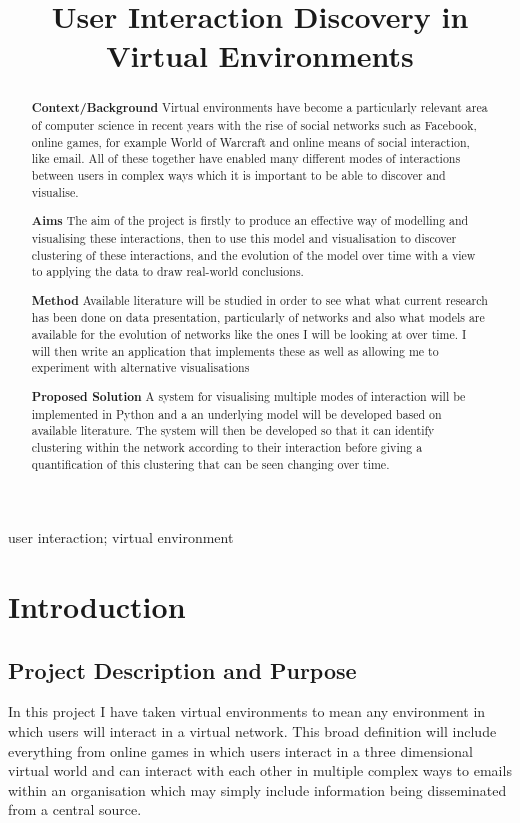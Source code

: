 \documentclass[12pt,a4paper]{article}
\title{User Interaction Discovery in Virtual Environments}
\date{}
\begin{document}
\maketitle

\begin{abstract}

{\bf Context/Background}
Virtual environments have become a particularly relevant area of computer science in recent years with the rise of social networks such as Facebook, online games, for example World of Warcraft and online means of social interaction, like email. All of these together have enabled many different modes of interactions between users in complex ways which it is important to be able to discover and visualise.

{\bf Aims}
The aim of the project is firstly to produce an effective way of modelling and visualising these interactions, then to use this model and visualisation to discover clustering of these interactions, and the evolution of the model over time with a view to applying the data to draw real-world conclusions.

{\bf Method}
Available literature will be studied in order to see what what current research has been done on data presentation, particularly of networks and also what models are available for the evolution of networks like the ones I will be looking at over time. I will then write an application that implements these as well as allowing me to experiment with alternative visualisations

{\bf Proposed Solution}
A system for visualising multiple modes of interaction will be implemented in Python and a an underlying model will be developed based on available literature. The system will then be developed so that it can identify clustering within the network according to their interaction before giving a quantification of this clustering that can be seen changing over time.

\end{abstract}

\begin{keywords}
user interaction; virtual environment
\end{keywords}

\section{Introduction}

\subsection{Project Description and Purpose}
In this project I have taken virtual environments to mean any environment in which users will interact in a virtual network. This broad definition will include everything from online games in which users interact in a three dimensional virtual world and can interact with each other in multiple complex ways to emails within an organisation which may simply include information being disseminated from a central source.
\end{document}
